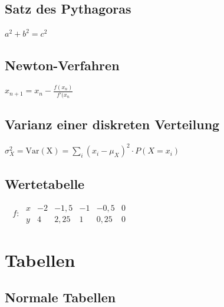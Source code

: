 \documentclass{scrreprt}
\begin{document}
		\section{Satz des Pythagoras} 

			\vspace{2pt}
			
			$ a^{2} + b^{2} = c^{2}
			\label{eq:pythagoras} $
			\vspace{10pt}
			\newline
		\section{Newton-Verfahren}

		\vspace{2pt}

			$ x_{n+1} = x_{n} - \frac{f(x_{n})}{f'(x_{n}} 
			\label{eq:newtonverfahren} $
			\vspace{10pt}
			\newline
		\section{Varianz einer diskreten Verteilung} 

			\vspace{2pt}

			$ \sigma^2_{X} = \mathrm{Var(X)} = \sum_i (x_i - \mu_{X})^2 \cdot P(X = x_i) \label{eq:varianzdiskret} $
			\vspace{10pt}
			\newline
		\section{Wertetabelle} 

		\vspace{2pt}

			$ \phantom{^{-1}}f\colon\; \begin{array}{r|c|c|c|c|c} x & -2 & -1,5 & -1 & -0,5 & 0 \\ \hline y & 4 & 2,25 & 1 & 0,25 & 0 \end{array} 
			\label{eq:wertetabelle} $

	\chapter{Tabellen}
			\label{se:tabellen}
		\section{Normale Tabellen}
					
\end{document}
